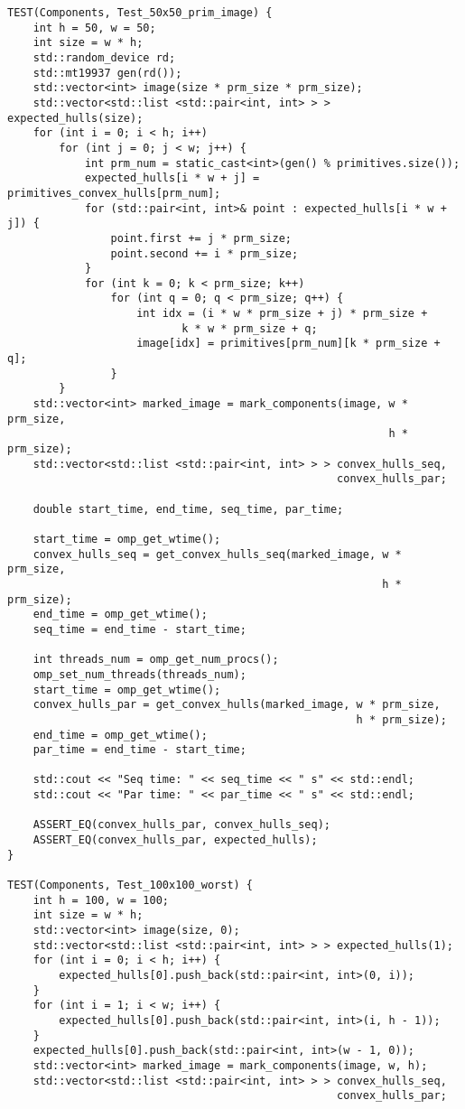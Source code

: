 \documentclass{report}
\begin{document}
\begin{lstlisting}
TEST(Components, Test_50x50_prim_image) {
    int h = 50, w = 50;
    int size = w * h;
    std::random_device rd;
    std::mt19937 gen(rd());
    std::vector<int> image(size * prm_size * prm_size);
    std::vector<std::list <std::pair<int, int> > > expected_hulls(size);
    for (int i = 0; i < h; i++)
        for (int j = 0; j < w; j++) {
            int prm_num = static_cast<int>(gen() % primitives.size());
            expected_hulls[i * w + j] = primitives_convex_hulls[prm_num];
            for (std::pair<int, int>& point : expected_hulls[i * w + j]) {
                point.first += j * prm_size;
                point.second += i * prm_size;
            }
            for (int k = 0; k < prm_size; k++)
                for (int q = 0; q < prm_size; q++) {
                    int idx = (i * w * prm_size + j) * prm_size +
                           k * w * prm_size + q;
                    image[idx] = primitives[prm_num][k * prm_size + q];
                }
        }
    std::vector<int> marked_image = mark_components(image, w * prm_size,
                                                           h * prm_size);
    std::vector<std::list <std::pair<int, int> > > convex_hulls_seq,
                                                   convex_hulls_par;

    double start_time, end_time, seq_time, par_time;

    start_time = omp_get_wtime();
    convex_hulls_seq = get_convex_hulls_seq(marked_image, w * prm_size,
                                                          h * prm_size);
    end_time = omp_get_wtime();
    seq_time = end_time - start_time;

    int threads_num = omp_get_num_procs();
    omp_set_num_threads(threads_num);
    start_time = omp_get_wtime();
    convex_hulls_par = get_convex_hulls(marked_image, w * prm_size,
                                                      h * prm_size);
    end_time = omp_get_wtime();
    par_time = end_time - start_time;

    std::cout << "Seq time: " << seq_time << " s" << std::endl;
    std::cout << "Par time: " << par_time << " s" << std::endl;

    ASSERT_EQ(convex_hulls_par, convex_hulls_seq);
    ASSERT_EQ(convex_hulls_par, expected_hulls);
}

TEST(Components, Test_100x100_worst) {
    int h = 100, w = 100;
    int size = w * h;
    std::vector<int> image(size, 0);
    std::vector<std::list <std::pair<int, int> > > expected_hulls(1);
    for (int i = 0; i < h; i++) {
        expected_hulls[0].push_back(std::pair<int, int>(0, i));
    }
    for (int i = 1; i < w; i++) {
        expected_hulls[0].push_back(std::pair<int, int>(i, h - 1));
    }
    expected_hulls[0].push_back(std::pair<int, int>(w - 1, 0));
    std::vector<int> marked_image = mark_components(image, w, h);
    std::vector<std::list <std::pair<int, int> > > convex_hulls_seq,
                                                   convex_hulls_par;


\end{lstlisting}
\end{document}
